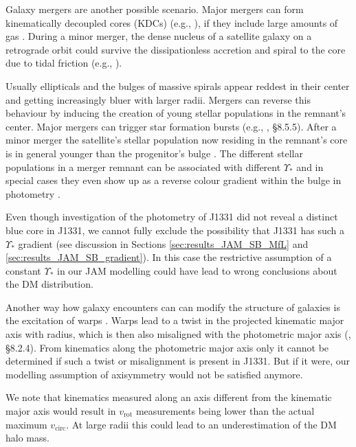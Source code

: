 \documentclass[useAMS,usenatbib]{mnras}
\begin{document}
Galaxy mergers are another possible scenario. Major mergers can form kinematically decoupled cores (KDCs) (e.g., \citealt{2011MNRAS.414.2923K,2015ApJ...802L...3T}), if they include large amounts of gas \citep{2010ApJ...723..818H}. During a minor merger, the dense nucleus of a satellite galaxy on a retrograde orbit could survive the dissipationless accretion and spiral to the core due to tidal friction (e.g., \citealt{1984ApJ...287..577K,1988ApJ...327L..55F}). 

Usually ellipticals and the bulges of massive spirals appear reddest in their center and getting increasingly bluer with larger radii. Mergers can reverse this behaviour by inducing the creation of young stellar populations in the remnant's center. Major mergers can trigger star formation bursts (e.g., \citealt{2008gady.book.....B}, \S 8.5.5). After a minor merger the satellite's stellar population now residing in the remnant's core is in general younger than the progenitor's bulge \citep{1996AJ....112..839C,2010MNRAS.404.1775T} . The different stellar populations in a merger remnant can be associated with different $\Upsilon_*$ and in special cases they even show up as a reverse colour gradient within the bulge in photometry \citep{1990ApJ...361..381B, 1997ApJ...481..710C}.

Even though investigation of the photometry of J1331 did not reveal a distinct blue core in J1331, we cannot fully exclude the possibility that J1331 has such a $\Upsilon_*$ gradient (see discussion in Sections \ref{sec:results_JAM_SB_MfL} and \ref{sec:results_JAM_SB_gradient}). In this case the restrictive assumption of a constant $\Upsilon_*$ in our JAM modelling could have lead to wrong conclusions about the DM distribution.

Another way how galaxy encounters can can modify the structure of galaxies is the excitation of warps \citep{1991wdir.book.....C,2013pss5.book..923S}. Warps lead to a twist in the projected kinematic major axis with radius, which is then also misaligned with the photometric major axis (\citealt{1998gaas.book.....B}, \S 8.2.4). From kinematics along the photometric major axis only it cannot be determined if such a twist or misalignment is present in J1331. But if it were, our modelling assumption of axisymmetry would not be satisfied anymore. 

We note that kinematics measured along an axis different from the kinematic major axis would result in $v_\text{rot}$ measurements being lower than the actual maximum $v_\text{circ}$. At large radii this could lead to an underestimation of the DM halo mass.
\end{document}
